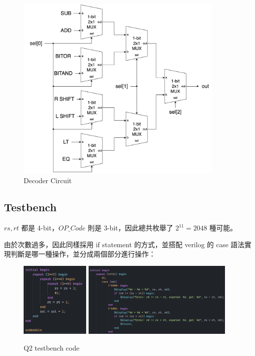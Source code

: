 \documentclass[10.5pt,compsoc,UTF8]{CjC}
\theoremstyle{mystyle}
\begin{document}
\begin{figure}[htp]
  \centering
  \includegraphics[width=0.9\textwidth]{Q2-decoder.png}
  \caption{Decoder Circuit}
  \label{fig:Decoder}
\end{figure}

\newpage

\subsection{Testbench}

$rs, rt$ 都是 4-bit，$OP\_Code$ 則是 3-bit，因此總共枚舉了 $2^{11} = 2048$ 種可能。
\par
由於次數過多，因此同樣採用 if statement 的方式，並搭配 verilog 的 case 語法實現判斷是哪一種操作，並分成兩個部分進行操作：

\begin{figure}[ht]
  \centering
  \includegraphics[width=0.3\textwidth]{Q2-tb1.png}
  \includegraphics[width=0.653\textwidth]{Q2-tb2.png}
  \caption{Q2 testbench code}
  \label{fig:Q2_tb}
\end{figure}
\end{document}
